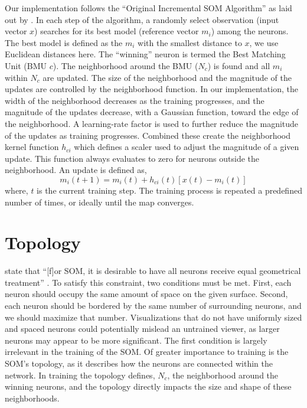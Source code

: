 Our implementation follows the ``Original Incremental SOM Algorithm'' as laid
out by \cite{Kohonen2000}.  In each step of the algorithm, a
randomly select observation (input vector $x$) searches for its best model
(reference vector $m_i$) among the neurons.  The best model is defined as the
$m_i$ with the smallest distance to $x$, we use Euclidean distances here.  The
``winning'' neuron is termed the Best Matching Unit (BMU $c$).  The
neighborhood around the BMU ($N_c$) is found and all $m_i$ within $N_c$ are
updated.  The size of the neighborhood and the magnitude of the updates are
controlled by the neighborhood function. In our implementation, the width of
the neighborhood decreases as the training progresses, and the magnitude of
the updates decrease, with a Gaussian function, toward the edge of the
neighborhood. A learning-rate factor is used to further reduce the magnitude
of the updates as training progresses.  Combined these create the neighborhood
kernel function $h_{ci}$ which defines a scaler used to adjust the magnitude
of a given update.  This function always evaluates to zero for neurons outside
the neighborhood.  An update is defined as,
\begin{equation}
  {m_i(t+1)} = m_i(t) +  h_{ci}(t)[x(t) - m_i(t)]
\label{update}
\end{equation}
where, $t$ is the current training step.  The training process is repeated a
predefined number of times, or ideally until the map converges.

\section{Topology}
\citeauthor{wu2006} state that ``[f]or SOM, it is desirable to have all
neurons receive equal geometrical treatment'' \cite[p. 900]{wu2006}.  To
satisfy this constraint, two conditions must be met.  First, each neuron
should occupy the same amount of space on the given surface.  Second, each
neuron should be bordered by the same number of surrounding neurons, and we
should maximize that number.  Visualizations that do not have uniformly sized
and spaced neurons could potentially mislead an untrained viewer, as larger
neurons may appear to be more significant. The first condition is
largely irrelevant in the training of the SOM.  Of greater importance to
training is the SOM's topology, as it describes how the neurons are connected
within the network.  In training the topology defines, $N_c$, the neighborhood
around the winning neurons, and the topology directly impacts the size and
shape of these neighborhoods.  

